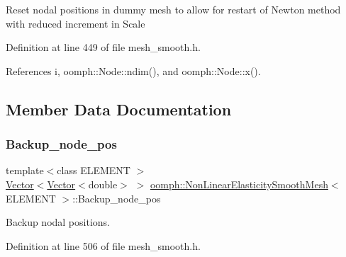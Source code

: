 Reset nodal positions in dummy mesh to allow for restart of Newton method with reduced increment in Scale 

Definition at line 449 of file mesh\+\_\+smooth.\+h.



References i, oomph\+::\+Node\+::ndim(), and oomph\+::\+Node\+::x().



\subsection{Member Data Documentation}
\mbox{\label{classoomph_1_1NonLinearElasticitySmoothMesh_a6ae3b3800d408d21fe1e6fa68575f58a}} 
\subsubsection{\texorpdfstring{Backup\+\_\+node\+\_\+pos}{Backup\_node\_pos}}
{\footnotesize\ttfamily template$<$class E\+L\+E\+M\+E\+NT $>$ \\
\hyperlink{classoomph_1_1Vector}{Vector}$<$\hyperlink{classoomph_1_1Vector}{Vector}$<$double$>$ $>$ \hyperlink{classoomph_1_1NonLinearElasticitySmoothMesh}{oomph\+::\+Non\+Linear\+Elasticity\+Smooth\+Mesh}$<$ E\+L\+E\+M\+E\+NT $>$\+::Backup\+\_\+node\+\_\+pos\hspace{0.3cm}{\ttfamily [private]}}



Backup nodal positions. 



Definition at line 506 of file mesh\+\_\+smooth.\+h.

\mbox{\label{classoomph_1_1NonLinearElasticitySmoothMesh_a3034da1f2e87fd7dcbabd6883ba7cdd9}} 
